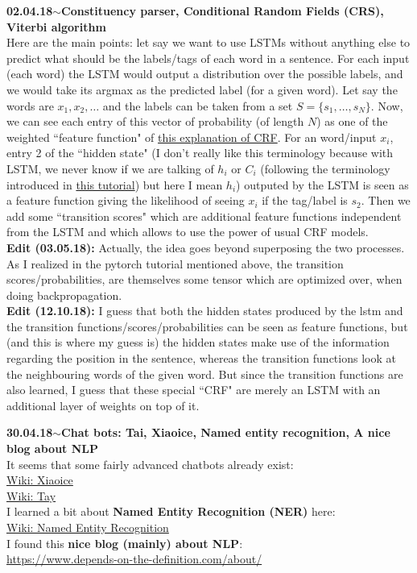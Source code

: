 \documentclass[11pt,a4paper]{article}
\newenvironment{loggentry}[2]%
{\noindent\textbf{#1}\hspace{1cm}$\mathbf{\sim}$\text{ }\textbf{#2}\\}{\vspace{0.5cm}}
\begin{document}
\begin{loggentry}{02.04.18}{Constituency parser, Conditional Random Fields (CRS), Viterbi algorithm}
Here are the main points: let say we want to use LSTMs without anything else to predict what should be the labels/tags of each word in a sentence. For each input (each word) the LSTM would output a distribution over the possible labels, and we would take its argmax as the predicted label (for a given word). Let say the words are $x_1, x_2,\dots$ and the labels can be taken from a set $S = \lbrace s_1,\dots, s_N \rbrace$. Now, we can see each entry of this vector of probability (of length $N$) as one of the weighted ``feature function" of \href{http://blog.echen.me/2012/01/03/introduction-to-conditional-random-fields/}{this explanation of CRF}. For an word/input $x_i$, entry 2 of the ``hidden state" (I don't really like this terminology because with LSTM, we never know if we are talking of $h_i$ or $C_i$ (following the terminology introduced in \href{https://colah.github.io/posts/2015-08-Understanding-LSTMs/}{this tutorial}) but here I mean $h_i$) outputed by the LSTM is seen as a feature function giving the likelihood of seeing $x_i$ if the tag/label is $s_2$. Then we add some ``transition scores" which are additional feature functions independent from the LSTM and which allows to use the power of usual CRF models.\\
\textbf{Edit (03.05.18):} Actually, the idea goes beyond superposing the two processes. As I realized in the pytorch tutorial mentioned above, the transition scores/probabilities, are themselves some tensor which are optimized over, when doing backpropagation.\\
\textbf{Edit (12.10.18):} I guess that both the hidden states produced by the lstm and the transition functions/scores/probabilities can be seen as feature functions, but (and this is where my guess is) the hidden states make use of the information regarding the position in the sentence, whereas the transition functions look at the neighbouring words of the given word. But since the transition functions are also learned, I guess that these special ``CRF" are merely an LSTM with an additional layer of weights on top of it.\\

\end{loggentry}

\begin{loggentry}{30.04.18}{Chat bots: Tai, Xiaoice, Named entity recognition, A nice blog about NLP}
It seems that some fairly advanced chatbots already exist:\\
\href{https://en.wikipedia.org/wiki/Xiaoice}{Wiki: Xiaoice}\\
\href{https://en.wikipedia.org/wiki/Tay_(bot)}{Wiki: Tay}\\
I learned a bit about \textbf{Named Entity Recognition (NER)} here:\\
\href{https://en.wikipedia.org/wiki/Named-entity_recognition}{Wiki: Named Entity Recognition}\\
I found this \textbf{nice blog (mainly) about NLP}:\\
\url{https://www.depends-on-the-definition.com/about/}\\
\end{loggentry}
\end{document}
